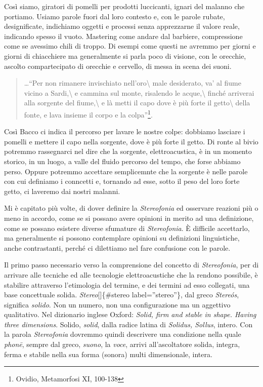\documentclass[a4paper,11pt]{article}
\begin{document}
Così siamo, giratori di pomelli per prodotti luccicanti, ignari del
malanno che portiamo. Usiamo parole fuori dal loro contesto e, con le
parole rubate, designificate, indichiamo oggetti e processi senza
apprezzarne il valore reale, indicando spesso il vuoto. Mastering come
andare dal barbiere, compressione come se avessimo chili di troppo. Di
esempi come questi ne avremmo per giorni e giorni di chiacchiere ma
generalmente si parla poco di visione, con le orecchie, ascolto
compartecipato di orecchie e cervello, di messa in scena dei suoni.

\begin{quote}
\ldots{}``Per non rimanere invischiato nell'oro\textbackslash{}
male desiderato, va' al fiume vicino a Sardi,\textbackslash{}
e cammina sul monte, risalendo le acque,\textbackslash{}
finché arriverai alla sorgente del fiume,\textbackslash{}
e là metti il capo dove è più forte il getto\textbackslash{}
della fonte, e lava insieme il corpo e la colpa''\footnote{Ovidio, Metamorfosi XI, 100-138}.
\end{quote}

Così Bacco ci indica il percorso per lavare le nostre colpe: dobbiamo
lasciare i pomelli e mettere il capo nella sorgente, dove è più forte il
getto. Di ronte al bivio potremmo rassegnarci nel dire che la sorgente,
elettroacustica, è in un momento storico, in un luogo, a valle del
fluido percorso del tempo, che forse abbiamo perso. Oppure potremmo
accettare semplicemnte che la sorgente è nelle parole con cui definiamo
i conncetti e, tornando ad esse, sotto il peso del loro forte getto, ci
laveremo dai nostri malanni.

Mi è capitato più volte, di dover definire la \emph{Stereofonia} ed osservare
reazioni più o meno in accordo, come se si possano avere opinioni in
merito ad una definizione, come se possano esistere diverse sfumature di
\emph{Stereofonia}. È difficile accettarlo, ma generalmente si possono
contemplare opinioni su definizioni linguistiche, anche contrastanti,
perché ci dilettiamo nel fare confusione con le parole.

Il primo passo necessario verso la comprensione del concetto di
\emph{Stereofonia}, per di arrivare alle tecniche ed alle tecnologie
elettroacustiche che la rendono possibile, è stabilire attraverso
l'etimologia del termine, e dei termini ad esso collegati, una base
concettuale solida. \emph{Stereo}{[}{]}\{\#stereo label=''stereo''\}, dal greco
\emph{Stereós}, significa \emph{solido}. Non un numero, non una configurazione ma
un aggettivo qualitativo. Nel dizionario inglese Oxford: \emph{Solid, firm
and stable in shape. Having three dimensions}. Solido, \emph{solid}, dalla
radice latina di \emph{Solidus, Sollus}, intero. Con la parola \emph{Stereofonia}
dovremmo quindi descrivere una condizione nella quale \emph{phonē}, sempre
dal greco, \emph{suono}, la \emph{voce}, arrivi all'ascoltatore solida, integra,
ferma e stabile nella sua forma (sonora) multi dimensionale, intera.
\end{document}
